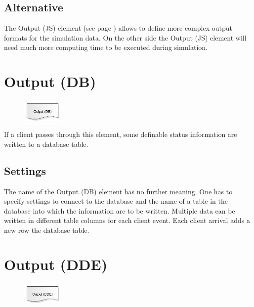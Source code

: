 \subsection*{Alternative}

The Output (JS) element (see page \pageref{ref:ModelElementOutputJS}) allows to define more complex output formats
for the simulation data. On the other side the Output (JS) element will need much more computing time to be
executed during simulation.


\section{Output (DB)}
\label{ref:ModelElementOutputDB}

\begin{figure}
\vspace{-22pt}
\includegraphics[width=2cm]{imageModelElementOutputDB.png}
\vspace{-22pt}
\end{figure}

If a client passes through this element, some definable status information are written to a database table.

\subsection*{Settings}

The name of the Output (DB) element has no further meaning. One has to specify settings to connect to
the database and the name of a table in the database into which the information are to be written.  
Multiple data can be written in different table columns for each client event. Each client arrival
adds a new row the database table.


\section{Output (DDE)}
\label{ref:ModelElementOutputDDE}

\begin{figure}
\vspace{-22pt}
\includegraphics[width=2cm]{imageModelElementOutputDDE.png}
\vspace{-22pt}
\end{figure}

